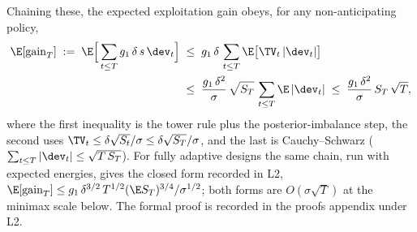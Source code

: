 Chaining these, the expected exploitation gain obeys, for any
non-anticipating policy,
\begin{align*}
\E[\mathrm{gain}_T]
\;:=\; \E\Big[\sum_{t\le T} g_1\,\delta\, s\,\dev_t\Big]
&\;\le\; g_1\,\delta\,\sum_{t\le T}\E\big[\TV_t\,|\dev_t|\big] \\
&\;\le\; \frac{g_1\,\delta^2}{\sigma}\,\sqrt{S_T}\,
\sum_{t\le T}\E\,|\dev_t|
\;\le\; \frac{g_1\,\delta^2}{\sigma}\, S_T\,\sqrt{T},
\end{align*}
where the first inequality is the tower rule plus the posterior-imbalance
step, the second uses $\TV_t\le\delta\sqrt{S_t}/\sigma
\le\delta\sqrt{S_T}/\sigma$, and the last is Cauchy--Schwarz
($\sum_{t\le T}|\dev_t| \le \sqrt{T\,S_T}$). For fully adaptive designs the
same chain, run with expected energies, gives the closed form recorded in
L2, $\E[\mathrm{gain}_T]\le g_1\,\delta^{3/2}\,T^{1/2}
(\E S_T)^{3/4}/\sigma^{1/2}$; both forms are $O(\sigma\sqrt{T})$ at the
minimax scale below. The formal proof is recorded in the proofs appendix
under L2.

